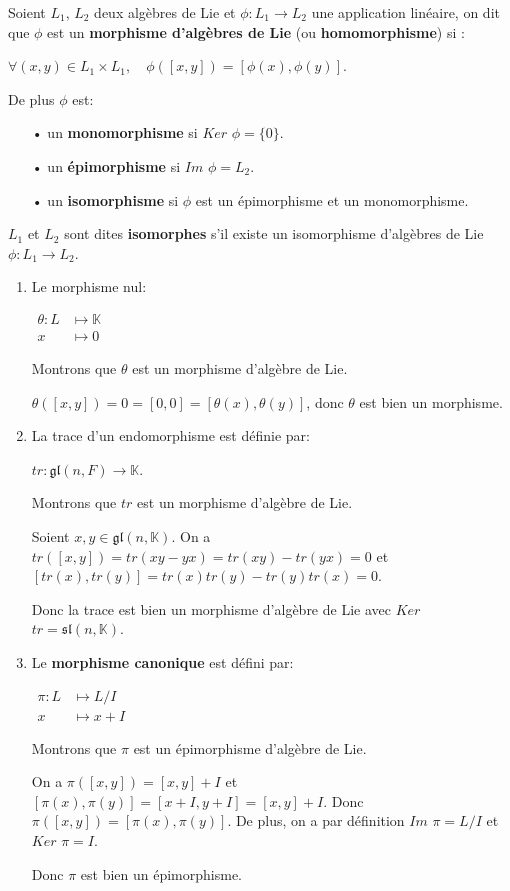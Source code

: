 \documentclass[a4paper,openany,12pt]{report}
\newcommand{\KK}{\mathbb{K}}
\newcommand{\gl}{\mathfrak{gl}}
\newcommand{\ssl}{\mathfrak{sl}}
\theoremstyle{break}
{\theorembodyfont{\upshape}
\newtheorem*{rmq}{Remarque :}
\newtheorem*{prv}{Preuve :}
\newtheorem*{ex}{Exemples :}
\newtheorem*{exe}{Exemple : }
\newtheorem*{nota}{Notation :}
\newtheorem*{dem}{D\'emonstration :}}
\begin{document}
\begin{df}
Soient $L_{1}$, $L_{2}$ deux algèbres de Lie et $\phi: L_{1} \rightarrow L_{2}$ une application linéaire, on dit que $\phi$ est un \textbf{morphisme d'algèbres de Lie} (ou \textbf{homomorphisme}) si :
\begin{center}
$ \forall(x, y) \in L_{1} \times L_{1}, \quad \phi([x, y])=[\phi(x), \phi(y)]$.
\end{center}
De plus $\phi$ est:
\begin{itemize}
\item[•] un \textbf{monomorphisme} si $Ker$ $\phi = \{ 0 \}$.
\item[•] un \textbf{épimorphisme} si $Im$ $\phi = L_{2}$.
\item[•] un \textbf{isomorphisme} si $\phi$ est un épimorphisme et un monomorphisme.
\end{itemize}
$L_{1}$ et $L_{2}$ sont dites \textbf{isomorphes} s'il existe un isomorphisme d'algèbres de Lie $\phi: L_{1} \rightarrow L_{2}$.  
\end{df}

\begin{ex}
\begin{enumerate}

\item Le morphisme nul:
\begin{center} 
$\begin{aligned} \theta: L & \longmapsto \KK \\ x & \longmapsto 0 \end{aligned}$
\end{center}
Montrons que $\theta$ est un morphisme d'algèbre de Lie.

$\theta([x,y]) = 0 = [0,0] = [\theta(x),\theta(y)]$, donc $\theta$ est bien un morphisme.

\item La trace d'un endomorphisme est définie par: 
\begin{center}
$tr: \gl(n,F) \longrightarrow \KK$.
\end{center}
Montrons que $tr$ est un morphisme d’algèbre de Lie.

Soient $x,y \in  \gl(n,\KK)$. On a $tr([x,y]) = tr(xy-yx) = tr(xy)-tr(yx) = 0$
et $[tr(x),tr(y)] = tr(x)tr(y)-tr(y)tr(x) = 0$.

Donc la trace est bien un morphisme d'algèbre de Lie avec $Ker$ $tr = \ssl(n,\KK)$.

\item Le \textbf{morphisme canonique} est défini par:  
\begin{center}
$\begin{aligned} \pi: L & \longmapsto L/I \\ x & \longmapsto x+I\end{aligned}$
\end{center}
Montrons que $\pi$ est un épimorphisme d'algèbre de Lie.

On a $\pi([x,y]) = [x,y]+I$ et $[\pi(x),\pi(y)] = [x+I,y+I] = [x,y]+I$. Donc $\pi([x,y]) = [\pi(x),\pi(y)]$. De plus, on a par définition $Im$ $\pi = L/I$ et $Ker$ $\pi = I$.

Donc $\pi$ est bien un épimorphisme.
\end{enumerate}
\end{ex}
\end{document}
